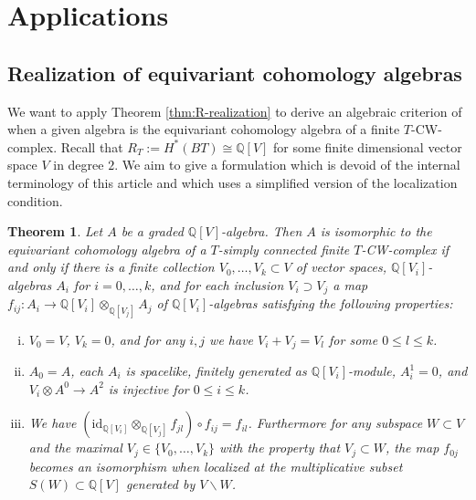 \documentclass[12pt,a4paper]{article}
\newcommand{\id}{\mathrm{id}}
\newtheorem{thm}{Theorem}[section]
\theoremstyle{definition}
\begin{document}
\section{Applications}
\subsection{Realization of equivariant cohomology algebras}
We want to apply Theorem \ref{thm:R-realization} to derive an algebraic criterion of when a given algebra is the equivariant cohomology algebra of a finite $T$-CW-complex. Recall that $R_T:=H^*(BT)\cong \mathbb{Q}[V]$ for some finite dimensional vector space $V$ in degree $2$. We aim to give a formulation which is devoid of the internal terminology of this article and which uses a simplified version of the localization condition.

\begin{thm}\label{thm:cohorealization}
Let $A$ be a graded $\mathbb{Q}[V]$-algebra. Then $A$ is isomorphic to the equivariant cohomology algebra of a $T$-simply connected finite $T$-CW-complex if and only if there is a finite collection $V_0,\ldots, V_k\subset V$ of vector spaces, $\mathbb{Q}[V_i]$-algebras $A_i$ for $i=0,\ldots,k$, and for each inclusion $V_i\supset V_j$ a map $f_{ij}\colon A_i\rightarrow \mathbb{Q}[V_i] \otimes_{\mathbb{Q}[V_j]} A_j$ of $\mathbb{Q}[V_i]$-algebras satisfying the following properties:
\begin{enumerate}[(i)]
\item  $V_0=V$, $V_k=0$, and for any $i,j$ we have $V_i+ V_j=V_l$ for some $0\leq l\leq k$.
\item $A_0=A$, each $A_i$ is spacelike, finitely generated as $\mathbb{Q}[V_i]$-module, $A_i^1=0$, and $V_i\otimes A^0\rightarrow A^2$ is injective for $0\leq i \leq k$.
\item We have $(\id_{\mathbb{Q}[V_i]}\otimes_{\mathbb{Q}[V_j]} f_{jl})\circ f_{ij}=f_{il}$. Furthermore for any subspace $W\subset V$ and the maximal $V_j\in\{V_0,\ldots,V_k\}$ with the property that $V_j\subset W$, the map $f_{0j}$ becomes an isomorphism when localized at the multiplicative subset $S(W)\subset \mathbb{Q}[V]$ generated by $V\backslash W$.
\end{enumerate}
\end{thm}
\end{document}
